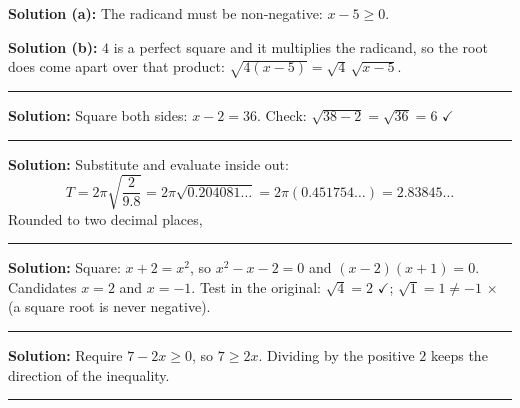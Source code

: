\documentclass[12pt]{article}
\begin{document}



\textbf{Solution (a):} The radicand must be non-negative: $x - 5 \ge 0$.

\textbf{Solution (b):} $4$ is a perfect square and it multiplies the radicand,
so the root does come apart over that product:
$\sqrt{4(x-5)} = \sqrt{4}\,\sqrt{x-5}$. 

\vspace{0.2cm}\noindent\rule{\linewidth}{0.2pt}\vspace{0.2cm}


\textbf{Solution:} Square both sides: $x - 2 = 36$. Check:
$\sqrt{38-2} = \sqrt{36} = 6$ $\checkmark$ 

\vspace{0.2cm}\noindent\rule{\linewidth}{0.2pt}\vspace{0.2cm}


\textbf{Solution:} Substitute and evaluate inside out:
\[ T = 2\pi\sqrt{\frac{2}{9.8}} = 2\pi\sqrt{0.204081\ldots}
     = 2\pi(0.451754\ldots) = 2.83845\ldots \]
Rounded to two decimal places, 

\vspace{0.2cm}\noindent\rule{\linewidth}{0.2pt}\vspace{0.2cm}


\textbf{Solution:} Square: $x + 2 = x^2$, so $x^2 - x - 2 = 0$ and
$(x-2)(x+1) = 0$. Candidates $x = 2$ and $x = -1$. Test in the original:
$\sqrt{4} = 2$ $\checkmark$; $\sqrt{1} = 1 \ne -1$ $\times$ (a square root is
never negative). 

\vspace{0.2cm}\noindent\rule{\linewidth}{0.2pt}\vspace{0.2cm}


\textbf{Solution:} Require $7 - 2x \ge 0$, so $7 \ge 2x$. Dividing by the
positive $2$ keeps the direction of the inequality. 

\vspace{0.2cm}\noindent\rule{\linewidth}{0.2pt}\vspace{0.2cm}
\end{document}
